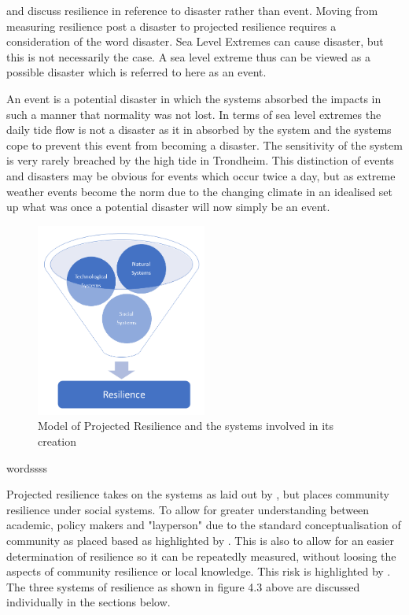 \cite{cutter_place-based_2008} and \cite{cutter_community_2020} discuss resilience in reference to disaster rather than event. Moving from measuring resilience post a disaster to projected resilience requires a consideration of the word disaster. Sea Level Extremes can cause disaster, but this is not necessarily the case. A sea level extreme thus can be viewed as a possible disaster which is referred to here as an event. 

An event is a potential disaster in which the systems absorbed the impacts in such a manner that normality was not lost. In terms of sea level extremes the daily tide flow is not a disaster as it in absorbed by the system and the systems cope to prevent this event from becoming a disaster. The sensitivity of the system is very rarely breached by the high tide in Trondheim. This distinction of events and disasters may be obvious for events which occur twice a day, but as extreme weather events become the norm due to the changing climate in an idealised set up what was once a potential disaster will now simply be an event. 

\begin{figure}[h]
    \centering
    \includegraphics[width=0.5\textwidth]{fig_theory/resilience model .png}
    \caption{Model of Projected Resilience and the systems involved in its creation}
    \label{fig:projected_resilience}
\end{figure}
wordssss

Projected resilience takes on the systems as laid out by \cite{cutter_community_2020}, but places community resilience under social systems. To allow for greater understanding between academic, policy makers and "layperson" due to the standard conceptualisation of community as placed based as highlighted by \cite{rasanen_conceptualizing_2020}. This is also to allow for an easier determination of resilience so it can be repeatedly measured, without loosing the aspects of community resilience or local knowledge. This risk is highlighted by \cite{rasanen_conceptualizing_2020}. The three systems of resilience as shown in figure 4.3 above are discussed individually in the sections below.

